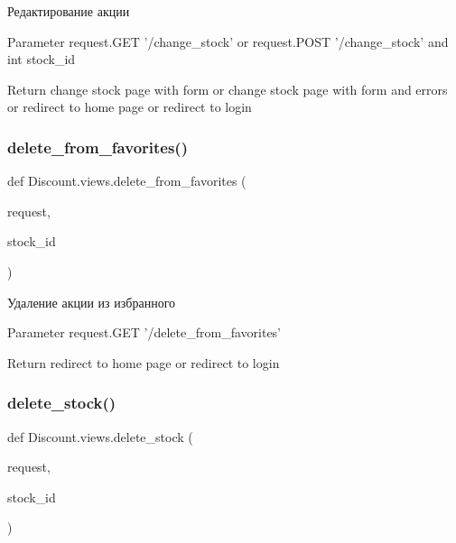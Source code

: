 \begin{DoxyVerb}Редактирование акции

Parameter
    request.GET '/change_stock' or request.POST '/change_stock' and int stock_id

Return
    change stock page with form
    or
    change stock page with form and errors
    or
    redirect to home page
    or
    redirect to login
\end{DoxyVerb}
 \mbox{\label{namespace_discount_1_1views_a5559ac3262f5e7c78873ffbbf044007f}} 
\subsubsection{\texorpdfstring{delete\+\_\+from\+\_\+favorites()}{delete\_from\_favorites()}}
{\footnotesize\ttfamily def Discount.\+views.\+delete\+\_\+from\+\_\+favorites (\begin{DoxyParamCaption}\item[{}]{request,  }\item[{}]{stock\+\_\+id }\end{DoxyParamCaption})}

\begin{DoxyVerb}Удаление акции из избранного

Parameter
    request.GET '/delete_from_favorites'

Return
    redirect to home page
    or
    redirect to login
\end{DoxyVerb}
 \mbox{\label{namespace_discount_1_1views_a8528cc1b935166d465b2ef597889bcb3}} 
\subsubsection{\texorpdfstring{delete\+\_\+stock()}{delete\_stock()}}
{\footnotesize\ttfamily def Discount.\+views.\+delete\+\_\+stock (\begin{DoxyParamCaption}\item[{}]{request,  }\item[{}]{stock\+\_\+id }\end{DoxyParamCaption})}

